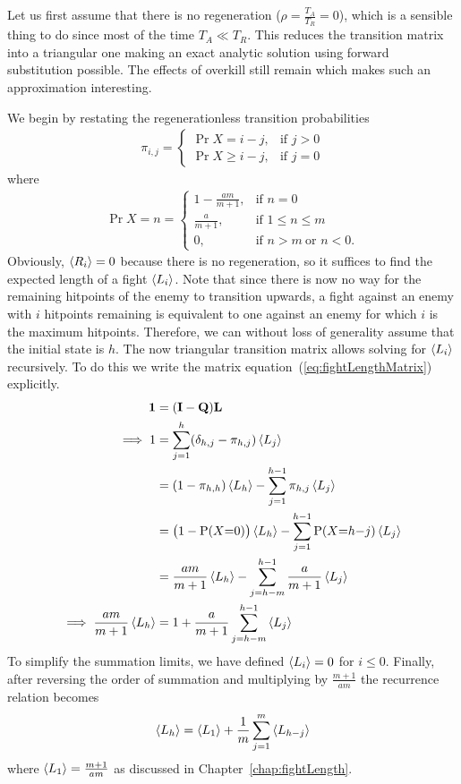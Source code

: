Let us first assume that there is no regeneration ($\rho = \frac{T_A}{T_R} = 0$), which is a sensible thing to do since most of the time $T_A \ll T_R$. This reduces the transition matrix into a triangular one making an exact analytic solution using forward substitution possible. The effects of overkill still remain which makes such an approximation interesting.

We begin by restating the regenerationless transition probabilities
\begin{align}
	\pi_{i,j} = \begin{cases}
		\Pr{X = i-j}, &\mbox{if } j > 0 \\
		\Pr{X \geq i-j}, &\mbox{if } j = 0
	\end{cases}
\end{align}
where
\begin{align}
	\Pr{X=n} = \begin{cases}
		1 - \frac{am}{m+1}, &\mbox{if } n = 0 \\
		\frac{a}{m+1},      &\mbox{if } 1 \leq n \leq m\\
		0,      			&\mbox{if } n > m\ \mbox{or } n < 0.
	\end{cases}
\end{align}
Obviously, $\left\langle R_i \right\rangle = 0$ because there is no regeneration, so it suffices to find the expected length of a fight $\left\langle L_i \right\rangle$. Note that since there is now no way for the remaining hitpoints of the enemy to transition upwards, a fight against an enemy with $i$ hitpoints remaining is equivalent to one against an enemy for which $i$ is the maximum hitpoints. Therefore, we can without loss of generality assume that the initial state is $h$.
The now triangular transition matrix allows solving for $\left\langle L_i \right\rangle$ recursively. To do this we write the matrix equation~(\ref{eq:fightLengthMatrix}) explicitly.
\begin{align*}
	\mathbf{1} &= (\mathbf{I} - \mathbf{Q})\mathbf{L}\\
	\implies 1 &= \sum_{j=1}^h(\delta_{h,j} - \pi_{h,j})\E{L_j}\\
		&= (1 - \pi_{h,h})\E{L_h} - \sum_{j=1}^{h-1} \pi_{h,j}\E{L_j}\\
		&= \big(1 - \Pr{X=0}\big)\E{L_h} - \sum_{j=1}^{h-1} \Pr{X=h-j}\E{L_j}\\
		&= \frac{am}{m+1}\E{L_h} - \sum_{j=h-m}^{h-1} \frac{a}{m+1}\E{L_j}\\
	\implies \frac{am}{m+1}\E{L_h}
		&= 1 + \frac{a}{m+1}\sum_{j=h-m}^{h-1} \E{L_j}
\end{align*}
To simplify the summation limits, we have defined $\left\langle L_i \right\rangle = 0$ for $i \leq 0$. Finally, after reversing the order of summation and multiplying by $\frac{m+1}{am}$ the recurrence relation becomes
\begin{align}
	\left\langle L_h \right\rangle = \left\langle L_1 \right\rangle + \frac{1}{m}\sum_{j=1}^m \left\langle L_{h-j} \right\rangle\label{eq:noregenRecursion}
\end{align}
where $\left\langle L_1 \right\rangle = \frac{m+1}{am}$ as discussed in Chapter~\ref{chap:fightLength}.
